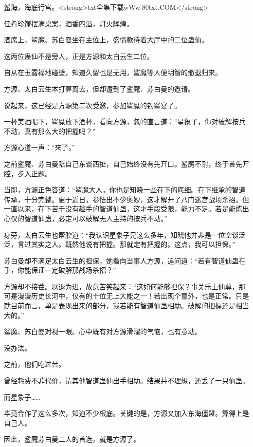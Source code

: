 
\begin{this_body}

鲨海，海底行宫。<strong>txt全集下载wWw.80txt.COM</strong>

佳肴珍馐摆满桌案，酒香四溢，灯火辉煌。

酒席上，鲨魔、苏白曼坐在主位上，盛情款待着大厅中的二位蛊仙。

这两位蛊仙不是旁人，正是方源和太白云生二位。

自从在玉露福地碰壁，知道久留也是无用，鲨魔等人便明智的撤退归来。

方源、太白云生本打算离去，但却遭到了鲨魔、苏白曼的邀请。

说起来，这已经是方源第二次受邀，参加鲨魔的钓鲨宴了。

一杯美酒喝下，鲨魔放下酒杯，看向方源，忽的直言道：“星象子，你对破解按兵不动，真有那么大的把握吗？”

方源心道一声：“来了。”

之前鲨魔、苏白曼陪自己东谈西扯，自己始终没有先开口。鲨魔不耐，终于首先开腔，步入正题。

当即，方源正色答道：“鲨魔大人，你也是知晓一些在下的底细。在下继承的智道传承，十分完整。更于近日，参悟出不少奥妙，这才解开了八门迷宫战场杀招。但一直以来，在下苦于没有趁手的智道仙蛊，这才手段受限，能力不足。若是能炼出心仪的智道仙蛊，必定可以破解无人主持的按兵不动。”

身旁，太白云生也帮腔道：“我认识星象子兄这么多年，知晓他并非是一位空谈泛泛，言过其实之人。既然他说有把握。那就定有把握的。这点，我可以担保。”

苏白曼却不满足太白云生的担保，她看向当事人方源，追问道：“若有智道仙蛊在手，你能保证一定破解那战场杀招？”

方源却不接茬。以退为进，故意苦笑起来：“这如何能够担保？事关乐土仙尊，那可是漫漫历史长河中，仅有的十位无上大能之一！若出现个意外，也是正常。只是就目前而言，单是表现出来的部分，我若能有智道仙蛊相助。破解的把握还是相当大的。”

鲨魔、苏白曼对视一眼。心中既有对方源滑溜的气恼，也有意动。

没办法。

之前，他们吃过苦。

曾经耗费不菲代价，请其他智道蛊仙出手相助。结果并不理想，还丢了一只仙蛊。

而星象子……

毕竟合作了这么多次，知道不少根底。关键的是，方源又加入东海僵盟。算得上是自己人。

因此，鲨魔苏白曼二人的首选，就是方源了。


\end{this_body}
